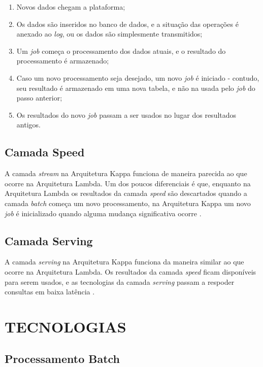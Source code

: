 \begin{enumerate}
    \item Novos dados chegam a plataforma;
    \item Os dados são inseridos no banco de dados, e a situação das operações
        é anexado ao \textit{log}, ou os dados são simplesmente transmitidos;
    \item Um \textit{job} começa o processamento dos dados atuais, e o
        resultado do processamento é armazenado;
    \item Caso um novo processamento seja desejado, um novo \textit{job}
        é iniciado - contudo, seu resultado é armazenado em uma nova tabela,
        e não na usada pelo \textit{job} do passo anterior;
    \item Os resultados do novo \textit{job} passam a ser usados no lugar
        dos resultados antigos.
\end{enumerate}

\subsection{Camada Speed}

A camada \textit{stream} na Arquitetura Kappa funciona de maneira parecida ao
que ocorre na Arquitetura Lambda. Um dos poucos diferenciais é que, enquanto
na Arquitetura Lambda os resultados da camada \textit{speed} são descartados
quando a camada \textit{batch} começa um novo processamento, na Arquitetura
Kappa um novo \textit{job} é inicializado quando alguma mudança significativa
ocorre \cite{forgeat2015}.

\subsection{Camada Serving}

A camada \textit{serving} na Arquitetura Kappa funciona da maneira similar ao
que ocorre na Arquitetura Lambda. Os resultados da camada \textit{speed}
ficam disponíveis para serem usados, e as tecnologias da camada \textit{serving}
passam a respoder consultas em baixa latência \cite{forgeat2015}.

\section{TECNOLOGIAS}

\subsection{Processamento Batch}

